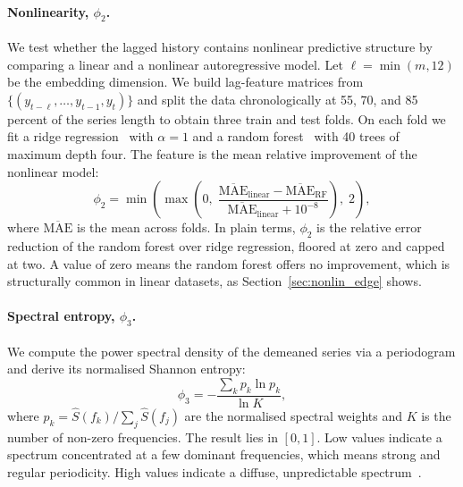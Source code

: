 \documentclass[pdflatex,sn-mathphys-num]{sn-jnl}
\theoremstyle{thmstyleone}
\theoremstyle{thmstyletwo}
\theoremstyle{thmstylethree}
\begin{document}
\paragraph{Nonlinearity, $\phi_2$.}
We test whether the lagged history contains nonlinear predictive structure by
comparing a linear and a nonlinear autoregressive model. Let
$\ell = \min(m, 12)$ be the embedding dimension. We build lag-feature matrices
from $\{(y_{t-\ell},\ldots,y_{t-1}, y_t)\}$ and split the data chronologically
at 55, 70, and 85 percent of the series length to obtain three train and test
folds. On each fold we fit a ridge regression~\cite{hoerl1970ridge} with
$\alpha = 1$ and a random forest~\cite{breiman2001random} with 40 trees of
maximum depth four. The feature is the mean relative improvement of the
nonlinear model:
\begin{equation}
  \phi_2 = \min\!\left(
    \max\!\left(0,\;
    \frac{\overline{\mathrm{MAE}}_{\mathrm{linear}} -
           \overline{\mathrm{MAE}}_{\mathrm{RF}}}
         {\overline{\mathrm{MAE}}_{\mathrm{linear}} + 10^{-8}}
    \right),\; 2
  \right),
  \label{eq:phi2}
\end{equation}
where $\overline{\mathrm{MAE}}$ is the mean across folds. In plain terms,
$\phi_2$ is the relative error reduction of the random forest over ridge
regression, floored at zero and capped at two. A value of zero means the
random forest offers no improvement, which is structurally common in linear
datasets, as Section~\ref{sec:nonlin_edge} shows.

\paragraph{Spectral entropy, $\phi_3$.}
We compute the power spectral density of the demeaned series via a periodogram
and derive its normalised Shannon entropy:
\begin{equation}
  \phi_3 = -\frac{\displaystyle\sum_{k} p_k \ln p_k}{\ln K},
  \label{eq:phi3}
\end{equation}
where $p_k = \hat{S}(f_k) / \sum_j \hat{S}(f_j)$ are the normalised spectral
weights and $K$ is the number of non-zero frequencies. The result lies in
$[0, 1]$. Low values indicate a spectrum concentrated at a few dominant
frequencies, which means strong and regular periodicity. High values indicate
a diffuse, unpredictable spectrum~\cite{spectral_entropy_ref}.
\end{document}
